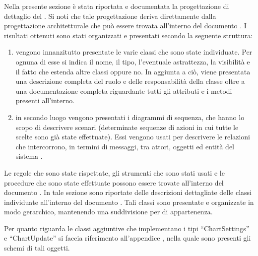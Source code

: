         Nella presente sezione è stata riportata e documentata la progettazione di dettaglio del  . Si noti che tale progettazione deriva direttamente dalla progettazione architetturale che può essere trovata all'interno del documento . I risultati ottenuti sono stati organizzati e presentati secondo la seguente struttura:
        \begin{enumerate}
            \item vengono innanzitutto presentate le varie classi che sono state individuate. Per ognuna di esse si indica il nome, il tipo, l'eventuale astrattezza, la visibilità e il fatto che estenda altre classi oppure no. In aggiunta a ciò, viene presentata una descrizione completa del ruolo e delle responsabilità della classe oltre a una documentazione completa riguardante tutti gli attributi e i metodi presenti all'interno.
            \item in secondo luogo vengono presentati i diagrammi di sequenza, che hanno lo scopo di descrivere scenari (determinate sequenze di azioni in cui tutte le scelte sono già state effettuate). Essi vengono usati per descrivere le relazioni che intercorrono, in termini di messaggi, tra attori, oggetti ed entità del sistema .
        \end{enumerate}
        Le regole che sono state rispettate, gli strumenti che sono stati usati e le procedure che sono state effettuate possono essere trovate all'interno del documento .
            In tale sezione sono riportate delle descrizioni dettagliate delle classi individuate all'interno del documento . Tali classi sono presentate e organizzate in modo gerarchico, mantenendo una suddivisione per  di appartenenza.
            

            Per quanto riguarda le classi aggiuntive che implementano i tipi “ChartSettings” e “ChartUpdate” si faccia riferimento all'appendice , nella quale sono presenti gli schemi  di tali oggetti.

